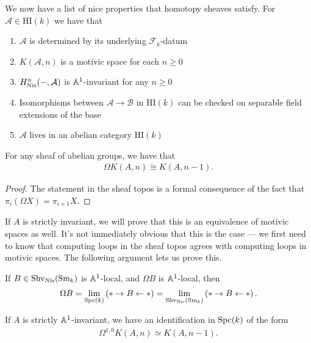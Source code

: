 \documentclass[11pt,openany]{book}
\providecommand{\HI}{\mathrm{HI}}
\begin{document}
We now have a list of nice properties that homotopy sheaves satisfy. For $\mathcal{A} \in \HI(k)$ we have that
\begin{enumerate}
    \item $\mathcal{A}$ is determined by its underlying $\mathcal{F}_k$-datum
    \item $K(\mathcal{A},n)$ is a motivic space for each $n\ge0$
    \item $H_{\mathrm{Nis}}^n(-,\mathcal{A})$ is $\mathbb{A}^1$-invariant for any $n\ge 0$
    \item Isomorphisms between $\mathcal{A} \to \mathcal{B}$ in $\HI(k)$ can be checked on separable field extensions of the base
    \item $\mathcal{A}$ lives in an abelian category $\HI(k)$
\end{enumerate}

\begin{proposition} For any sheaf of abelian groups, we have that
\begin{align*}
    \Omega K(A,n) \cong K(A,n-1).
\end{align*}
\end{proposition}
\begin{proof} The statement in the sheaf topos is a formal consequence of the fact that $\pi_i(\Omega X) = \pi_{i+1}X$.
\end{proof}

If $A$ is strictly invariant, we will prove that this is an equivalence of motivic spaces as well. It's not immediately obvious that this is the case --- we first need to know that computing loops in the sheaf topos agrees with computing loops in motivic spaces. The following argument lets us prove this.

\begin{remark} If $B \in \mathrm{Shv}_{\mathrm{Nis}}(\mathrm{Sm}_k)$ is $\mathbb{A}^1$-local, and $\Omega B$ is $\mathbb{A}^1$-local, then
\begin{align*}
    \Omega B = \lim_{\mathrm{Spc}(k)} \left( \ast \to B \leftarrow \ast \right) = \lim_{\mathrm{Shv}_{\mathrm{Nis}}(\mathrm{Sm}_k)} \left( \ast \to B \leftarrow \ast \right).
\end{align*}
\end{remark}

\begin{corollary}
If $A$ is strictly $\mathbb{A}^1$-invariant, we have an identification in $\mathrm{Spc}(k)$ of the form
\begin{align*}
    \Omega^{1,0} K(A,n) \simeq K(A,n-1).
\end{align*}
\end{corollary}
\end{document}
